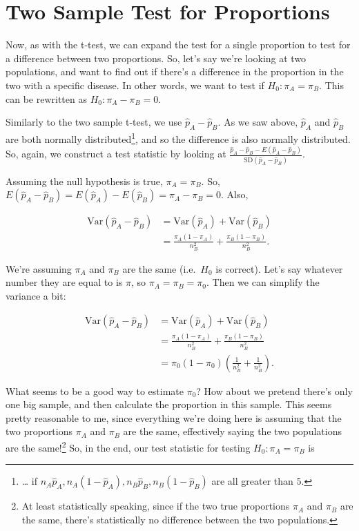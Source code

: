 \documentclass[]{book}
\let\rmarkdownfootnote\footnote%
\def\footnote{\protect\rmarkdownfootnote}
\theoremstyle{definition}
\theoremstyle{definition}
\theoremstyle{definition}
\theoremstyle{remark}
\begin{document}
\hypertarget{two-sample-test-for-proportions}{%
\section{Two Sample Test for Proportions}\label{two-sample-test-for-proportions}}

Now, as with the t-test, we can expand the test for a single proportion to test for a difference between two proportions. So, let's say we're looking at two populations, and want to find out if there's a difference in the proportion in the two with a specific disease. In other words, we want to test if \(H_0: \pi_A = \pi_B\). This can be rewritten as \(H_0: \pi_A - \pi_B = 0\).

Similarly to the two sample t-test, we use \(\hat{p}_A - \hat{p}_B\). As we saw above, \(\hat{p}_A\) and \(\hat{p}_B\) are both normally distributed\footnote{\ldots{} if \(n_A\hat{p}_A, n_A(1-\hat{p}_A), n_B\hat{p}_B, n_B(1-\hat{p}_B)\) are all greater than \(5\).}, and so the difference is also normally distributed. So, again, we construct a test statistic by looking at \(\frac{\hat{p}_A - \hat{p}_B - E(\hat{p}_A - \hat{p}_B)}{\text{SD}(\hat{p}_A - \hat{p}_B)}\).

Assuming the null hypothesis is true, \(\pi_A = \pi_B\). So, \(E(\hat{p}_A - \hat{p}_B) = E(\hat{p}_A) - E(\hat{p}_B) = \pi_A - \pi_B = 0\). Also,

\begin{align*}
  \text{Var}(\hat{p}_A - \hat{p}_B) &= \text{Var}(\hat{p}_A) + \text{Var}(\hat{p}_B) \\
                              &= \frac{\pi_A(1-\pi_A)}{n_B^2} + \frac{\pi_B(1-\pi_B)}{n_B^2}.
\end{align*}

We're assuming \(\pi_A\) and \(\pi_B\) are the same (i.e.~\(H_0\) is correct). Let's say whatever number they are equal to is \(\pi\), so \(\pi_A = \pi_B = \pi_0\). Then we can simplify the variance a bit:

\begin{align*}
  \text{Var}(\hat{p}_A - \hat{p}_B) &= \text{Var}(\hat{p}_A) + \text{Var}(\hat{p}_B) \\
                              &= \frac{\pi_A(1-\pi_A)}{n_B^2} + \frac{\pi_B(1-\pi_B)}{n_B^2} \\
                              &= \pi_0(1-\pi_0)\left(\frac{1}{n_B^2} + \frac{1}{n_B^2}\right).
\end{align*}

What seems to be a good way to estimate \(\pi_0\)? How about we pretend there's only one big sample, and then calculate the proportion in this sample. This seems pretty reasonable to me, since everything we're doing here is assuming that the two proportions \(\pi_A\) and \(\pi_B\) are the same, effectively saying the two populations are the same!\footnote{At least statistically speaking, since if the two true proportions \(\pi_A\) and \(\pi_B\) are the same, there's statistically no difference between the two populations.} So, in the end, our test statistic for testing \(H_0: \pi_A = \pi_B\) is
\end{document}

